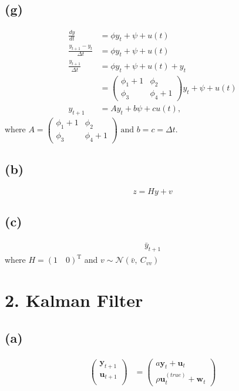 \documentclass[fleqn, letterpaper]{tufte-handout}
\newcommand{\T}{^\text{T}}
\begin{document}
\subsection{(g)}
\begin{align*}
        \frac{dy}{dt} &= \phi y_t + \psi + u(t) \\
        \frac{y_{t+1}-y_t}{\Delta t} &= \phi y_t + \psi + u(t) \\
        \frac{y_{t+1}}{\Delta t} &= \phi y_t + \psi + u(t) + y_t\\
                                 &= \begin{pmatrix} \phi_1+1 & \phi_2 \\ \phi_3 &\phi_4+1\end{pmatrix} y_t + \psi + u(t)\\
        y_{t+1} &= Ay_t + b\psi + cu(t),
\end{align*}
where $A = \begin{pmatrix} \phi_1+1 & \phi_2 \\ \phi_3 &\phi_4+1\end{pmatrix}\text{ and } b = c = \Delta t
$.

\subsection{(b)}
\[z = Hy + v\]

\subsection{(c)}
\begin{align*}
        \bar{y}_{t+1}
\end{align*}
where $ H = (1\quad 0)\T $ and $v\sim\mathcal{N}(\bar{v},\ C_{vv})$

\section{2. Kalman Filter}

{\scriptsize
        \begin{minipage}{\linewidth}
                
        \end{minipage}
}

\subsection{(a)}
\begin{align*}
\begin{pmatrix}
\mathbf{y}_{t+1} \\
\mathbf{u}_{t+1} \\
\end{pmatrix}
&=
\begin{pmatrix}
a\mathbf{y}_t + \mathbf{u}_t \\
\rho\mathbf{u}^{(true)}_t+ \mathbf{w}_t
\end{pmatrix}
\end{align*}
\end{document}
